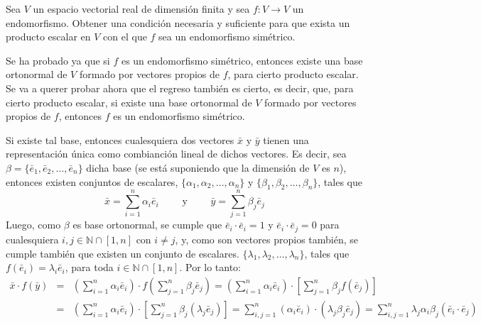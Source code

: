 \begin{enunciado}
 Sea $V$ un espacio vectorial real de dimensi\'on finita y sea $f: V \to V$ un endomorfismo. Obtener una condici\'on necesaria y suficiente para que exista un producto escalar en $V$ con el que $f$ sea un endomorfismo sim\'etrico.
\end{enunciado}

\begin{solucion}
 Se ha probado ya que si $f$ es un endomorfismo sim\'etrico, entonces existe una base ortonormal de $V$ formado por vectores propios de $f$, para cierto producto escalar. Se va a querer probar ahora que el regreso tambi\'en es cierto, es decir, que, para cierto producto escalar, si existe una base ortonormal de $V$ formado por vectores propios de $f$, entonces $f$ es un endomorfismo sim\'etrico.
 \par 
 Si existe tal base, entonces cualesquiera dos vectores $\bar{x}$ y $\bar{y}$ tienen una representaci\'on \'unica como combianci\'on lineal de dichos vectores. Es decir, sea $\beta = \{ \bar{e}_1, \bar{e}_2, \ldots, \bar{e}_n \}$ dicha base (se est\'a suponiendo que la dimensi\'on de $V$ es $n$), entonces existen conjuntos de escalares, $\{\alpha_1, \alpha_2, \ldots, \alpha_n \}$ y $\{ \beta_1, \beta_2, \ldots, \beta_n \}$, tales que
 \begin{equation*}
  \bar{x} = \sum_{i=1}^n \alpha_i \bar{e}_i
  \qquad \text{ y } \qquad 
  \bar{y} = \sum_{j=1}^n \beta_j \bar{e}_j
 \end{equation*}
 Luego, como $\beta$ es base ortonormal, se cumple que $\bar{e}_i\cdot\bar{e}_i = 1$ y $\bar{e}_i\cdot \bar{e}_j = 0$ para cualesquiera $i,j\in\mathbb{N}\cap[1,n]$ con $i\neq j$, y, como son vectores propios tambi\'en, se cumple tambi\'en que existen un conjunto de escalares. $\{ \lambda_1, \lambda_2, \ldots, \lambda_n \}$, tales que $f(\bar{e}_i) = \lambda_i \bar{e}_i$, para toda $i\in\mathbb{N}\cap[1,n]$. Por lo tanto:
 \begin{eqnarray*}
  \bar{x}\cdot f(\bar{y}) & = & \left( \sum_{i=1}^n \alpha_i \bar{e}_i \right) \cdot f\left( \sum_{j=1}^n \beta_j \bar{e}_j \right) = \left( \sum_{i=1}^n \alpha_i \bar{e}_i \right) \cdot \left[ \sum_{j=1}^n \beta_j f(\bar{e}_j) \right] \\
  & = & \left( \sum_{i=1}^n \alpha_i \bar{e}_i \right) \cdot \left[ \sum_{j=1}^n \beta_j (\lambda_j \bar{e}_j) \right] = \sum_{i,j=1}^n (\alpha_i \bar{e}_i) \cdot (\lambda_j \beta_j \bar{e}_j) = \sum_{i,j=1}^n \lambda_j \alpha_i \beta_j (\bar{e}_i \cdot \bar{e}_j) \\

\end{eqnarray*}
\end{solucion}
